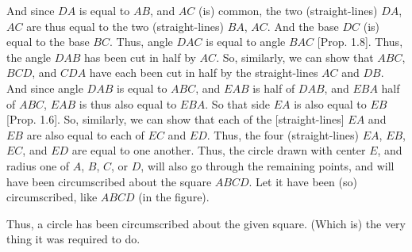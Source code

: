 \begin{Parallel}{}{}
{And since $DA$ is equal to $AB$, and $AC$ (is) common, the two (straight-lines)
$DA$, $AC$ are thus equal to the two (straight-lines) $BA$, $AC$. And the base $DC$
(is) equal to the base $BC$. Thus, angle $DAC$ is equal to angle $BAC$ [Prop. 1.8]. Thus, the angle $DAB$ has been cut in half by $AC$. So, similarly,
we can show that $ABC$, $BCD$, and $CDA$ have each been cut in half
by the straight-lines $AC$ and $DB$. And since angle $DAB$ is equal
 to $ABC$, and $EAB$ is half of $DAB$, and $EBA$ half of $ABC$, $EAB$ is thus
 also equal to $EBA$. So that side $EA$ is also equal to  $EB$ [Prop. 1.6]. So, similarly, we can show that each of the [straight-lines] $EA$ and $EB$ are also equal to each of $EC$ and $ED$. Thus, the four (straight-lines)
 $EA$, $EB$, $EC$, and $ED$ are equal to one another. Thus, the circle drawn with
 center $E$, and radius one of $A$, $B$, $C$, or $D$, will also go through the remaining points, and will have been circumscribed about the square $ABCD$. Let
 it have been (so) circumscribed, like $ABCD$ (in the figure).
 
 Thus, a circle has been circumscribed about the given square.
 (Which is) the very thing it was required to do.}
\end{Parallel}

